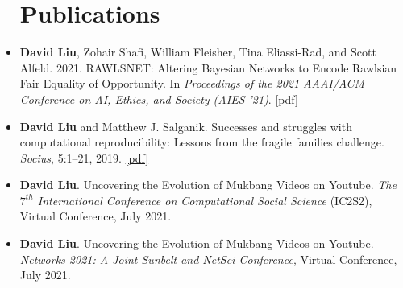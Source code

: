 \documentclass[margin]{res}
\begin{document}
\begin{resume}
\begin{itemize}
\section{Publications}
\item[] 
\textbf{David Liu}, Zohair Shafi, William Fleisher, Tina Eliassi-Rad, and Scott Alfeld. 2021. RAWLSNET: Altering Bayesian Networks to Encode Rawlsian Fair Equality of Opportunity. In \textit{Proceedings of the 2021 AAAI/ACM Conference on AI, Ethics, and Society (AIES ’21)}. \href{https://doi.org/10.1145/3461702.3462618}{[pdf]}\\
\item[]
\textbf{David Liu} and Matthew J. Salganik. Successes and struggles with computational reproducibility: Lessons from the fragile families challenge. \textit{Socius}, 5:1–21, 2019.  \href{https://doi.org/10.1177/2378023119849803}{[pdf]}
\end{itemize}

\begin{itemize}
\section{Posters}
\item[]
\textbf{David Liu}. Uncovering the Evolution of Mukbang Videos on Youtube. \textit{The $7^{th}$ International Conference on Computational Social Science} (IC2S2), Virtual Conference, July 2021.
\item[]
\textbf{David Liu}. Uncovering the Evolution of Mukbang Videos on Youtube. \textit{Networks 2021: A Joint Sunbelt and NetSci Conference}, Virtual Conference, July 2021.
\end{itemize}
%


\end{resume}
\end{document}
